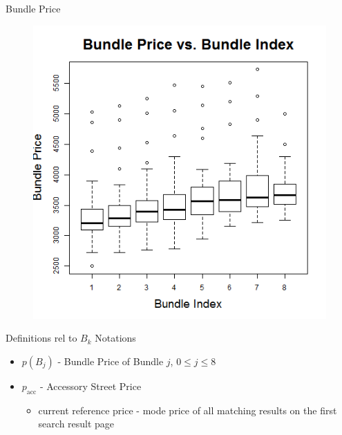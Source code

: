 \documentclass[xcolor=dvipsnames,12pt]{beamer}
\theoremstyle{definition}
\DeclareMathOperator{\acc}{acc}
\begin{document}
\begin{frame}{Bundle Price}
\begin{figure}
\graphicspath{ {../../0_relative_to_bundle_0/} }
\includegraphics[scale=0.43]{7_zzzz_boxplot_bundle_price_bundle_index}
\end{figure}
\end{frame}



\begin{frame}{Definitions rel to $B_k$}
Notations
\begin{itemize}
	
	\item $p(B_j)$ - Bundle Price of Bundle $j$, $0 \le j \le 8$ 
	\item $p_{\acc}$ - Accessory Street Price \pause
	 	\begin{itemize}
	 		\item current reference price - mode price of all matching results on the first search result page
	 	\end{itemize}
%
%
%
\end{itemize}
\end{frame}
\end{document}
